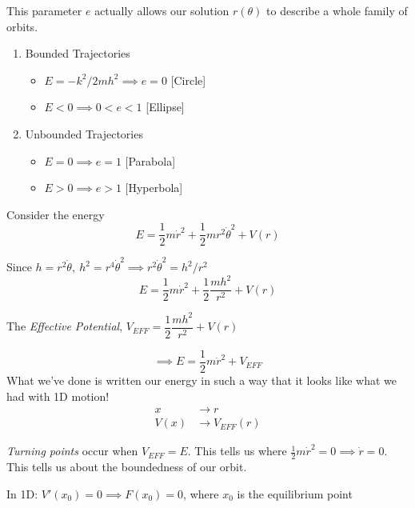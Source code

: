 This parameter $e$ actually allows our solution $r(\theta)$ to describe a whole family of orbits. 
\begin{examples}
\begin{enumerate}
\item Bounded Trajectories
\begin{itemize}
\item $E = -k^2/2mh^2 \implies e = 0$ [Circle] 	
\item $E < 0 \implies 0 < e < 1$ [Ellipse]
\end{itemize}

\item Unbounded Trajectories
\begin{itemize}
\item $E = 0 \implies e = 1$ [Parabola]
\item $E > 0 \implies e > 1$ [Hyperbola]	
\end{itemize}

\end{enumerate}
	
\end{examples}

Consider the energy 
\[E = \frac{1}{2}m\dot{r}^2 + \frac{1}{2}mr^2\dot{\theta}^2 + V(r)\]

Since $h = r^2\dot{\theta},~ h^2 = r^4\dot{\theta}^2 \implies r^2\dot{\theta}^2 = h^2/r^2$
\[E = \frac{1}{2}m\dot{r}^2 + \frac{1}{2}\frac{mh^2}{r^2} + V(r)\]

\begin{definition}
The \emph{Effective Potential}, $V_{EFF} =\dfrac{1}{2}\dfrac{mh^2}{r^2} + V(r)$	
\end{definition}
\[\implies E = \frac{1}{2}m\dot{r}^2 + V_{EFF}\]
What we've done is written our energy in such a way that it looks like what we had with 1D motion! 
\[\begin{aligned}x &\longrightarrow r \\
V(x) &\longrightarrow V_{EFF}(r)
\end{aligned}
\]

\begin{definition} \emph{Turning points} occur when $V_{EFF} = E$. This tells us where $\frac{1}{2}m\dot{r}^2 = 0 \implies \dot{r} = 0$. This tells us about the boundedness of our orbit. 

\end{definition}
\pagebreak

In 1D: $V'(x_0) = 0 \implies F(x_0) = 0$, where $x_0$ is the equilibrium point


